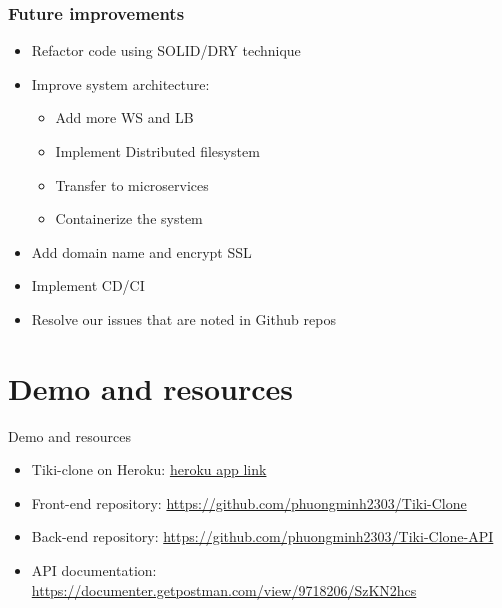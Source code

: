 \documentclass{beamer}
\begin{document}
\begin{frame}[fragile]
\frametitle{Future improvements}
    \begin{itemize}
    	\item Refactor code using SOLID/DRY technique
    	\item Improve system architecture: 
    	    \begin{itemize}
    	        \item Add more WS and LB
    	        \item Implement Distributed filesystem
    	        \item Transfer to microservices
    	        \item Containerize the system
    	    \end{itemize}
        \item Add domain name and encrypt SSL
        \item Implement CD/CI 
        \item Resolve our issues that are noted in Github repos
	\end{itemize}
\end{frame}

\section{Demo and resources}
	
\begin{frame}{Demo and resources}
	\begin{itemize}
	    \item Tiki-clone on Heroku: \url{heroku app link}
	    \item Front-end repository: \url{https://github.com/phuongminh2303/Tiki-Clone}
	    \item Back-end repository: \url{https://github.com/phuongminh2303/Tiki-Clone-API}
	    \item API documentation: \url{https://documenter.getpostman.com/view/9718206/SzKN2hcs}
	\end{itemize}
\end{frame}
\end{document}
